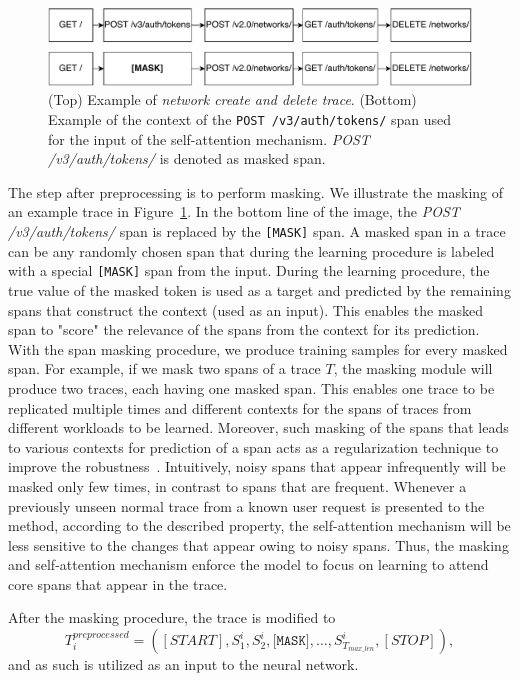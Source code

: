 \begin{figure}[htbp]
\centerline{\includegraphics[width=1.0\textwidth]{gfx/chap6/exampleTracesMask.pdf}}
\caption{(Top) Example of \textit{network create and delete trace}. (Bottom) Example of the context of the \texttt{POST /v3/auth/tokens/} span used for the input of the self-attention mechanism. \textit{POST /v3/auth/tokens/} is denoted as masked span.}
\label{fig:exampletrace}
\end{figure}

The step after preprocessing is to perform masking. We illustrate the masking of an example trace in Figure~\ref{fig:exampletrace}. In the bottom line of the image, the \textit{POST /v3/auth/tokens/} span is replaced by the \texttt{[MASK]} span. A masked span in a trace can be any randomly chosen span that during the learning procedure is labeled with a special \texttt{[MASK]} span from the input. During the learning procedure, the true value of the masked token is used as a target and predicted by the remaining spans that construct the context (used as an input). This enables the masked span to "score" the relevance of the spans from the context for its prediction. With the span masking procedure, we produce training samples for every masked span. For example, if we mask two spans of a trace $T$, the masking module will produce two traces, each having one masked span. This enables one trace to be replicated multiple times and different contexts for the spans of traces from different workloads to be learned. Moreover, such masking of the spans that leads to various contexts for prediction of a span acts as a regularization technique to improve the robustness~\cite{devlin2018bert}. Intuitively, noisy spans that appear infrequently will be masked only few times, in contrast to spans that are frequent. Whenever a previously unseen normal trace from a known user request is presented to the method, according to the described property, the self-attention mechanism will be less sensitive to the changes that appear owing to noisy spans. Thus, the masking and self-attention mechanism enforce the model to focus on learning to attend core spans that appear in the trace.

After the masking procedure, the trace is modified to  
\begin{equation}
    T_{i}^{preprocessed}=([START], S_1^i, S_2^i, \texttt{[MASK]}, \dots, S_{T_{max\_len}}^i, [STOP]),
\end{equation}
and as such is utilized as an input to the neural network.

